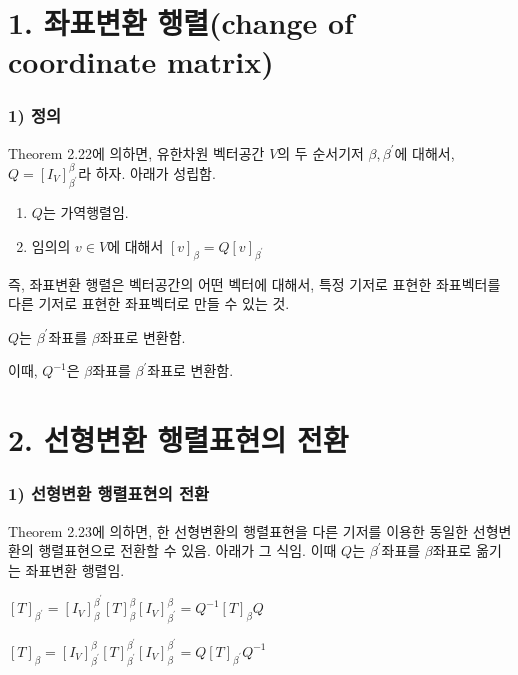 \section*{1. 좌표변환 행렬(change of coordinate matrix)}

\subsubsection*{1) 정의\\}
\begin{DEF}
Theorem 2.22에 의하면, 유한차원 벡터공간 $V$의 두 순서기저 $\beta, \beta^{\prime}$에 대해서, $Q=[I_V]^{\beta}_{\beta^{\prime}}$라 하자. 아래가 성립함.

\begin{enumerate}
    \item $Q$는 가역행렬임.
    \item 임의의 $v \in V$에 대해서 $[v]_{\beta}=Q[v]_{\beta^{\prime}}$
\end{enumerate}
\end{DEF}

즉, 좌표변환 행렬은 벡터공간의 어떤 벡터에 대해서, 특정 기저로 표현한 좌표벡터를 다른 기저로 표현한 좌표벡터로 만들 수 있는 것.

$Q$는 $\beta^{\prime}$좌표를 $\beta$좌표로 변환함.

이때, $Q^{-1}$은 $\beta$좌표를 $\beta^{\prime}$좌표로 변환함.\\


\section*{2. 선형변환 행렬표현의 전환}
\subsubsection*{1) 선형변환 행렬표현의 전환}
Theorem 2.23에 의하면, 한 선형변환의 행렬표현을 다른 기저를 이용한 동일한 선형변환의 행렬표현으로 전환할 수 있음. 아래가 그 식임. 이때 $Q$는 $\beta^{\prime}$좌표를 $\beta$좌표로 옮기는 좌표변환 행렬임.

\begin{center}
$[T]_{\beta^{\prime}}=[I_V]_{\beta}^{\beta^\prime}[T]^{\beta}_{\beta}[I_V]_{\beta^{\prime}}^{\beta}=Q^{-1}[T]_{\beta}Q$
\end{center}

\begin{center}
$[T]_{\beta}=[I_V]^{\beta}_{\beta^\prime}[T]^{\beta^{\prime}}_{\beta^{\prime}}[I_V]^{\beta^{\prime}}_{\beta}=Q[T]_{\beta^{\prime}}Q^{-1}$    
\end{center}

